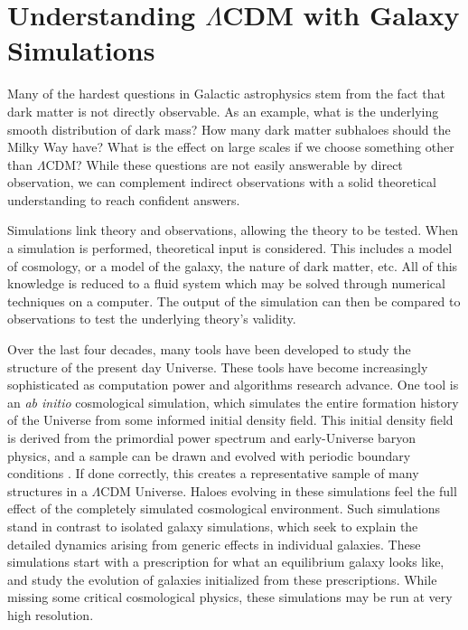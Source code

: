 



\section{Understanding $\Lambda$CDM with Galaxy Simulations}

Many of the hardest questions in Galactic astrophysics stem from the fact that dark matter is not directly observable. As an example, what is the underlying smooth distribution of dark mass? How many dark matter subhaloes should the Milky Way have? What is the effect on large scales if we choose something other than $\Lambda$CDM? While these questions are not easily answerable by direct observation, we can complement indirect observations with a solid theoretical understanding to reach confident answers.

Simulations link theory and observations, allowing the theory to be tested. When a simulation is performed, theoretical input is considered. This includes a model of cosmology, or a model of the galaxy, the nature of dark matter, etc. All of this knowledge is reduced to a fluid system which may be solved through numerical techniques on a computer.  The output of the simulation can then be compared to observations to test the underlying theory's validity.

Over the last four decades, many tools have been developed to study the structure of the present day Universe. These tools have become increasingly sophisticated as computation power and algorithms research advance. One tool is an \textit{ab initio} cosmological simulation, which simulates the entire formation history of the Universe from some informed initial density field.  This initial density field is derived from the primordial power spectrum and early-Universe baryon physics, and a sample can be drawn and evolved with periodic boundary conditions \citep{music}. If done correctly, this creates a representative sample of many structures in a $\Lambda$CDM Universe. Haloes evolving in these simulations feel the full effect of the completely simulated cosmological environment. Such simulations stand in contrast to isolated galaxy simulations, which seek to explain the detailed dynamics arising from generic effects in individual galaxies. These simulations start with a prescription for what an equilibrium galaxy looks like, and study the evolution of galaxies initialized from these prescriptions. While missing some critical cosmological physics, these simulations may be run at very high resolution.


